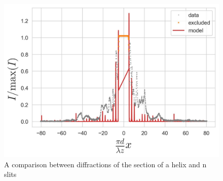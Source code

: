 \begin{figure}[H]
    \includegraphics[width=0.9\columnwidth]{figures/n slits section.jpeg}
    \caption{A comparison between diffractions of the section of a helix and n slits}
    \label{fig:n slits section}
\end{figure}